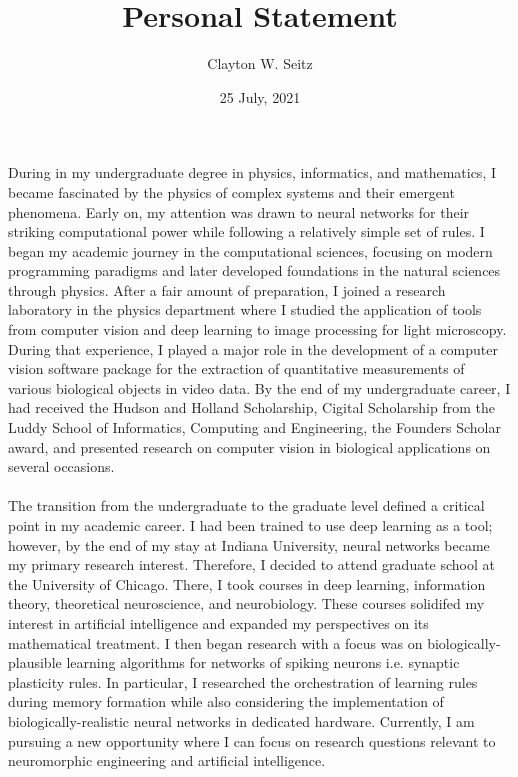 \documentclass{article}
\title{Personal Statement}
\author{Clayton W. Seitz}
\date{25 July, 2021}
\begin{document}
  \maketitle%
\vspace{0.4in}

\indent During in my undergraduate degree in physics, informatics, and mathematics, I became fascinated by the physics of complex systems and their emergent phenomena. Early on, my attention was drawn to neural networks for their striking computational power while following a relatively simple set of rules. I began my academic journey in the computational sciences, focusing on modern programming paradigms and later developed foundations in the natural sciences through physics. After a fair amount of preparation, I joined a research laboratory in the physics department where I studied the application of tools from computer vision and deep learning to image processing for light microscopy. During that experience, I played a major role in the development of a computer vision software package for the extraction of quantitative measurements of various biological objects in video data. By the end of my undergraduate career, I had received the Hudson and Holland Scholarship, Cigital Scholarship from the Luddy School of Informatics, Computing and Engineering, the Founders Scholar award, and presented research on computer vision in biological applications on several occasions.\\
\\
\indent  The transition from the undergraduate to the graduate level defined a critical point in my academic career. I had been trained to use deep learning as a tool; however, by the end of my stay at Indiana University, neural networks became my primary research interest. Therefore, I decided to attend graduate school at the University of Chicago. There, I took courses in deep learning, information theory, theoretical neuroscience, and neurobiology. These courses solidifed my interest in artificial intelligence and expanded my perspectives on its mathematical treatment. I then began research with a focus was on biologically-plausible learning algorithms for networks of spiking neurons i.e. synaptic plasticity rules. In particular, I researched the orchestration of learning rules during memory formation while also considering the implementation of biologically-realistic neural networks in dedicated hardware. Currently, I am pursuing a new opportunity where I can focus on research questions relevant to neuromorphic engineering and artificial intelligence.\\
\end{document}
